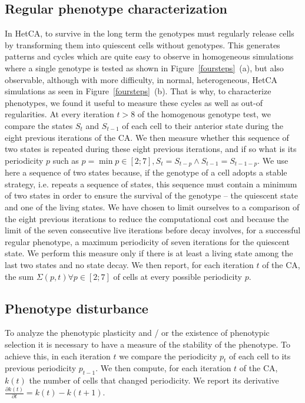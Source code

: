 \subsection{Regular phenotype characterization} 
In HetCA, to survive in the long term the genotypes must regularly release cells by transforming them into quiescent cells without genotypes. This generates patterns and cycles which are quite easy to observe in homogeneous simulations where a single genotype is tested as shown in Figure~\ref{foursteps}~(a), but also observable, although with more difficulty, in normal, heterogeneous, HetCA simulations as seen in Figure~\ref{foursteps}~(b). That is why, to characterize phenotypes, we found it useful to measure these cycles as well as out-of regularities. At every iteration $t>8$ of the homogenous genotype test, we compare the states $S_t$ and $S_{t-1}$ of each cell to their anterior state during the eight previous iterations of the CA. We then measure whether this sequence of two states is repeated during these eight previous iterations, and if so what is its periodicity $p$ such as $p=\min p \in [2;7], S_t=S_{t-p} \wedge S_{t-1}=S_{t-1-p}$. We use here a sequence of two states because, if the genotype of a cell adopts a stable strategy, i.e. repeats a sequence of states, this sequence must contain a minimum of two states in order to ensure the survival of the genotype -- the quiescent state and one of the living states. We have chosen to limit ourselves to a comparison of the eight previous iterations to reduce the computational cost and because the limit of the seven consecutive live iterations before decay involves, for a successful regular phenotype, a maximum periodicity of seven iterations for the quiescent state. We perform this measure only if there is at least a living state among the last two states and no state decay. We then report, for each iteration $t$ of the CA, the sum $\Sigma(p,t)\forall p \in [2;7]$ of cells at every possible periodicity $p$. 

\subsection{Phenotype disturbance} 
To analyze the phenotypic plasticity and / or the existence of phenotypic selection it is necessary to have a measure of the stability of the phenotype. To achieve this, in each iteration $t$ we compare the periodicity $p_t$ of each cell to its previous periodicity $p_{t-1}$. We then compute, for each iteration $t$ of the CA, $k(t)$ the number of cells that changed periodicity. We report its derivative $ \frac{\partial k(t)}{\partial t}= k(t)-k(t+1)$.


